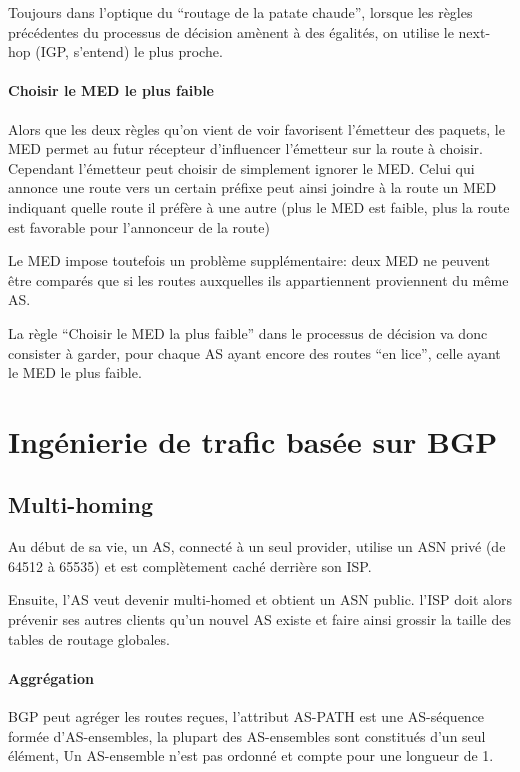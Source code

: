 \documentclass{report}
\begin{document}
Toujours dans l'optique du ``routage de la patate chaude'', lorsque
les règles précédentes du processus de décision amènent à des
égalités, on utilise le next-hop (IGP, s'entend) le plus proche.

\paragraph{Choisir le MED le plus faible}

Alors que les deux règles qu'on vient de voir favorisent l'émetteur
des paquets, le MED permet au futur récepteur d'influencer l'émetteur
sur la route à choisir. Cependant l'émetteur peut choisir de
simplement ignorer le MED. Celui qui annonce une route vers un certain
préfixe peut ainsi joindre à la route un MED indiquant quelle route il
préfère à une autre (plus le MED est faible, plus la route est
favorable pour l'annonceur de la route)

Le MED impose toutefois un problème supplémentaire: deux MED ne
peuvent être comparés que si les routes auxquelles ils appartiennent
proviennent du même AS.

La règle ``Choisir le MED la plus faible'' dans le processus de
décision va donc consister à garder, pour chaque AS ayant encore des
routes ``en lice'', celle ayant le MED le plus faible.

\section{Ingénierie de trafic basée sur BGP}

\subsection{Multi-homing}

Au début de sa vie, un AS, connecté à un seul provider, utilise un ASN
privé (de 64512 à 65535) et est complètement caché derrière son ISP.

Ensuite, l'AS veut devenir multi-homed et obtient un ASN public. l'ISP
doit alors prévenir ses autres clients qu'un nouvel AS existe et faire
ainsi grossir la taille des tables de routage globales.

\paragraph{Aggrégation}

BGP peut agréger les routes reçues, l'attribut AS-PATH est une
AS-séquence formée d'AS-ensembles, la plupart des AS-ensembles sont
constitués d'un seul élément, Un AS-ensemble n'est pas ordonné et
compte pour une longueur de 1.
\end{document}
